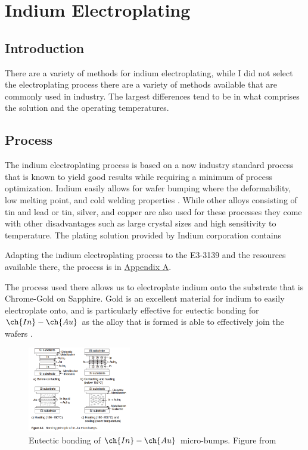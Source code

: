 \chapter{Indium Electroplating}

\section{Introduction}
There are a variety of methods for indium electroplating, while I did not select the electroplating process there are a variety of methods available that are commonly used in industry. The largest differences tend to be in what comprises the solution and the operating temperatures.

\section{Process}
The indium electroplating process is based on a now industry standard process that is known to yield good results while requiring a minimum of process optimization. Indium easily allows for wafer bumping where the deformability, low melting point, and cold welding properties \cite{indiumCorpPulsing}. While other alloys consisting of tin and lead or tin, silver, and copper are also used for these processes they come with other disadvantages such as large crystal sizes and high sensitivity to temperature. The plating solution provided by Indium corporation contains


Adapting the indium electroplating process to the E3-3139 and the resources available there, the process is in \hyperref[sec:SOP]{Appendix A}.

The process used there allows us to electroplate indium onto the substrate that is Chrome-Gold on Sapphire. Gold is an excellent material for indium to easily electroplate onto, and is particularly effective for eutectic bonding for $\ch{In}-\ch{Au}$ as the alloy that is formed is able to effectively join the wafers \cite{waferBondingHandbook}.

\begin{figure}
    \centering
    \includegraphics[width=0.4\textwidth]{Main/Ch1/indium_bonding.png}
    \caption{Eutectic bonding of $\ch{In}-\ch{Au}$ micro-bumps. Figure from \cite{waferBondingHandbook}}
    \label{fig:waferbondingdiagram}
\end{figure}



